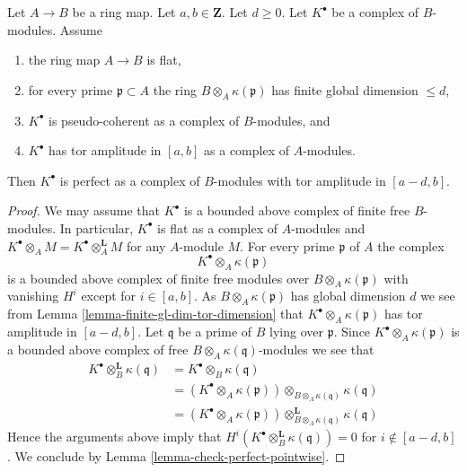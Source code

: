 \begin{lemma}
\label{lemma-perfect-over-polynomial-ring}
Let $A \to B$ be a ring map. Let $a, b \in \mathbf{Z}$. Let $d \geq 0$.
Let $K^\bullet$ be a complex of $B$-modules. Assume
\begin{enumerate}
\item the ring map $A \to B$ is flat,
\item for every prime $\mathfrak p \subset A$ the ring
$B \otimes_A \kappa(\mathfrak p)$ has finite global dimension $\leq d$,
\item $K^\bullet$ is pseudo-coherent as a complex of $B$-modules, and
\item $K^\bullet$ has tor amplitude in $[a, b]$ as a complex
of $A$-modules.
\end{enumerate}
Then $K^\bullet$ is perfect as a complex of $B$-modules
with tor amplitude in $[a - d, b]$.
\end{lemma}

\begin{proof}
We may assume that $K^\bullet$ is a bounded above complex of
finite free $B$-modules. In particular, $K^\bullet$ is flat as a
complex of $A$-modules and
$K^\bullet \otimes_A M = K^\bullet \otimes_A^{\mathbf{L}} M$ for any
$A$-module $M$. For every prime $\mathfrak p$ of $A$ the complex
$$
K^\bullet \otimes_A \kappa(\mathfrak p)
$$
is a bounded above complex of finite free modules over
$B \otimes_A \kappa(\mathfrak p)$ with vanishing $H^i$ except
for $i \in [a, b]$. As $B \otimes_A \kappa(\mathfrak p)$
has global dimension $d$ we see from
Lemma \ref{lemma-finite-gl-dim-tor-dimension}
that $K^\bullet \otimes_A \kappa(\mathfrak p)$ has tor amplitude in
$[a - d, b]$. Let $\mathfrak q$ be a prime of $B$ lying over $\mathfrak p$.
Since $K^\bullet \otimes_A \kappa(\mathfrak p)$ is a bounded above
complex of free $B \otimes_A \kappa(\mathfrak q)$-modules we see
that
\begin{align*}
K^\bullet \otimes_B^{\mathbf{L}} \kappa(\mathfrak q)
& = K^\bullet \otimes_B \kappa(\mathfrak q) \\
& = (K^\bullet \otimes_A \kappa(\mathfrak p))
\otimes_{B \otimes_A \kappa(\mathfrak q)} \kappa(\mathfrak q) \\
& = (K^\bullet \otimes_A \kappa(\mathfrak p))
\otimes^{\mathbf{L}}_{B \otimes_A \kappa(\mathfrak q)} \kappa(\mathfrak q)
\end{align*}
Hence the arguments above imply that
$H^i(K^\bullet \otimes_B^{\mathbf{L}} \kappa(\mathfrak q)) = 0$
for $i \not \in [a - d, b]$. We conclude by
Lemma \ref{lemma-check-perfect-pointwise}.
\end{proof}

